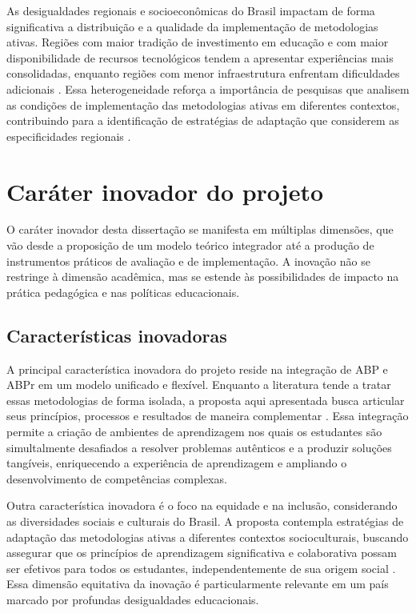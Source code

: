 As desigualdades regionais e socioeconômicas do Brasil impactam de forma significativa a distribuição e a qualidade da implementação de metodologias ativas. Regiões com maior tradição de investimento em educação e com maior disponibilidade de recursos tecnológicos tendem a apresentar experiências mais consolidadas, enquanto regiões com menor infraestrutura enfrentam dificuldades adicionais \cite{GUSMAO2022}. Essa heterogeneidade reforça a importância de pesquisas que analisem as condições de implementação das metodologias ativas em diferentes contextos, contribuindo para a identificação de estratégias de adaptação que considerem as especificidades regionais \cite{SILVA2023}.

\section{Caráter inovador do projeto}
\label{sec:caracter_inovador}

O caráter inovador desta dissertação se manifesta em múltiplas dimensões, que vão desde a proposição de um modelo teórico integrador até a produção de instrumentos práticos de avaliação e de implementação. A inovação não se restringe à dimensão acadêmica, mas se estende às possibilidades de impacto na prática pedagógica e nas políticas educacionais.

\subsection{Características inovadoras}
\label{subsec:carac_inov}

A principal característica inovadora do projeto reside na integração de ABP e ABPr em um modelo unificado e flexível. Enquanto a literatura tende a tratar essas metodologias de forma isolada, a proposta aqui apresentada busca articular seus princípios, processos e resultados de maneira complementar \cite{BACICH2018}. Essa integração permite a criação de ambientes de aprendizagem nos quais os estudantes são simultalmente desafiados a resolver problemas autênticos e a produzir soluções tangíveis, enriquecendo a experiência de aprendizagem e ampliando o desenvolvimento de competências complexas.

Outra característica inovadora é o foco na equidade e na inclusão, considerando as diversidades sociais e culturais do Brasil. A proposta contempla estratégias de adaptação das metodologias ativas a diferentes contextos socioculturais, buscando assegurar que os princípios de aprendizagem significativa e colaborativa possam ser efetivos para todos os estudantes, independentemente de sua origem social \cite{CALLEGARIO2025}. Essa dimensão equitativa da inovação é particularmente relevante em um país marcado por profundas desigualdades educacionais.

